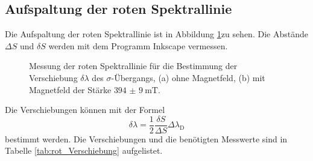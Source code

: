 \subsection{Aufspaltung der roten Spektrallinie}
Die Aufspaltung der roten Spektrallinie ist in Abbildung \ref{fig:rot_ohne_B}zu sehen.
Die Abstände $\Delta S$ und $\delta S$ werden mit dem Programm Inkscape \cite{Inkscape} vermessen.
\FloatBarrier
\begin{figure}
    \centering
    \vspace{0.1\textwidth}
    \caption{Messung der roten Spektrallinie für die Bestimmung der Verschiebung $\delta \lambda$ des $\sigma$-Übergangs, (a) ohne Magnetfeld, (b) mit Magnetfeld der Stärke $\SI{394(9)}{\milli\tesla}$.}
    \label{fig:rot_ohne_B}
\end{figure}
\FloatBarrier
Die Verschiebungen können mit der Formel 
\begin{equation}
    \label{eq:Verschiebung}
    \delta \lambda = \frac{1}{2}\frac{\delta S}{\Delta S}\Delta \lambda_{\text{D}} 
\end{equation}
bestimmt werden.
Die Verschiebungen und die benötigten Messwerte sind in Tabelle \ref{tab:rot_Verschiebung} aufgelistet.
\FloatBarrier
